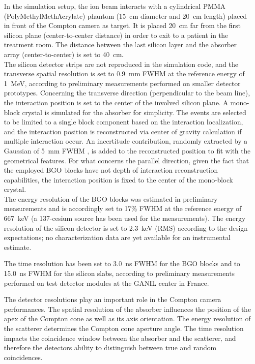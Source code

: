 In the simulation setup, the ion beam interacts with a cylindrical PMMA (PolyMethylMethAcrylate) phantom (15~cm diameter and 20~cm length) placed in front of the Compton camera as target. It is placed 20~cm far from the first silicon plane (center-to-center distance) in order to exit to a patient in the treatment room. The distance between the last silicon layer and the absorber array (center-to-center) is set to 40~cm.\\
The silicon detector strips are not reproduced in the simulation code, and the transverse spatial resolution is set to 0.9~mm FWHM at the reference energy of 1~MeV, according to preliminary measurements performed on smaller detector prototypes. Concerning the transverse direction (perpendicular to the beam line), the interaction position is set to the center of the involved silicon plane. A mono-block crystal is simulated for the absorber for simplicity. The events are selected to be limited to a single block component based on the interaction localization, and the interaction position is reconstructed via center of gravity calculation if multiple interaction occur. An incertitude contribution, randomly extracted by a Gaussian of 5~mm FWHM , is added to the reconstructed position to fit with the geometrical features. For what concerns the parallel direction, given the fact that the employed BGO blocks have not depth of interaction reconstruction capabilities, the interaction position is fixed to the center of the mono-block crystal.\\
The energy resolution of the BGO blocks was estimated in preliminary measurements and is accordingly set to 17\% FWHM at the reference energy of 667~keV (a 137-cesium source has been used for the measurements). The energy resolution of the silicon detector is set to 2.3~keV (RMS) according to the design expectations; no characterization data are yet available for an instrumental estimate.

The time resolution has been set to 3.0~ns FWHM for the BGO blocks and to 15.0~ns FWHM for the silicon slabs, according to preliminary measurements performed on test detector modules at the GANIL %
center in France.



The detector resolutions play an important role in the Compton camera performances. The spatial resolution of the absorber influences the position of the apex of the Compton cone as well as its axis orientation. The energy resolution of the scatterer determines the Compton cone aperture angle. The time resolution impacts the coincidence window between the absorber and the scatterer, and therefore the detectors ability to distinguish between true and random coincidences.

